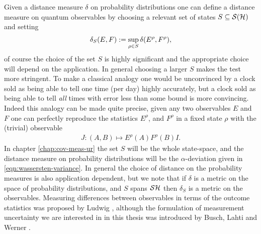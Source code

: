 Given a distance measure $\delta$ on probability distributions one can define a distance measure on quantum observables by choosing a relevant set of states $S\subseteq \dops[\hcal]$ and setting
\begin{align}
  \delta_S(E, F) := \sup_{\rho\in S} \delta(E^\rho, F^\rho),
\end{align}
of course the choice of the set $S$ is highly significant and the appropriate choice will depend on the application. In general choosing a larger $S$ makes the test more stringent. To make a classical analogy one would be unconvinced by a clock sold as being able to tell one time (per day) highly accurately, but a clock sold as being able to tell \emph{all} times with error less than some bound is more convincing. Indeed this analogy can be made quite precise, given any two observables $E$ and $F$ one can perfectly reproduce the statistics $E^\rho$, and $F^\rho$ in a fixed state $\rho$ with the (trivial) observable
\begin{align}
  J: (A,B) \mapsto E^\rho(A) F^\rho(B) I.
\end{align}
In chapter \ref{chap:cov-meas-ur} the set $S$ will be the whole state-space, and the distance measure on probability distributions will be the  $\alpha$-deviation given in \eqref{eqn:wassersten-variance}. In general the choice of distance on the probability measures is also application dependent, but we note that if $\delta$ is a metric on the space of probability distributions, and $S$ spans $\dops{\hcal}$ then $\delta_S$ is a metric on the observables. Measuring differences between observables in terms of the outcome statistics was proposed by Ludwig \cite{ludwig-foundations-of-qm}, although the formulation of measurement uncertainty we are interested in in this thesis was introduced by Busch, Lahti and Werner \cite{blw-meas-uncertainty}.